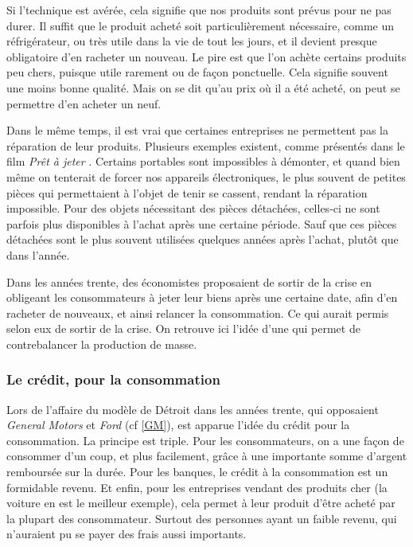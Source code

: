 Si l'\op technique est avérée, cela signifie que nos produits sont prévus pour ne pas durer. Il suffit que le produit acheté soit particulièrement nécessaire, comme un réfrigérateur, ou très utile dans la vie de tout les jours, et il devient presque obligatoire d'en racheter un nouveau. Le pire est que l'on achète certains produits peu chers, puisque utile rarement ou de façon ponctuelle. Cela signifie souvent une moins bonne qualité. Mais on se dit qu'au prix où il a été acheté, on peut se permettre d'en acheter un neuf.

Dans le même temps, il est vrai que certaines entreprises ne permettent pas la réparation de leur produits. Plusieurs exemples existent, comme présentés dans le film \textit{Prêt à jeter} \cite{PretAjeter}. Certains portables sont impossibles à démonter, et quand bien même on tenterait de forcer nos appareils électroniques, le plus souvent de petites pièces qui permettaient à l'objet de tenir se cassent, rendant la réparation impossible. Pour des objets nécessitant des pièces détachées, celles-ci ne sont parfois plus disponibles à l'achat après une certaine période. Sauf que ces pièces détachées sont le plus souvent utilisées quelques années après l'achat, plutôt que dans l'année.

\bigbreak
Dans les années trente, des économistes proposaient de sortir de la crise en obligeant les consommateurs à jeter leur biens après une certaine date, afin d'en racheter de nouveaux, et ainsi relancer la consommation. Ce qui aurait permis selon eux de sortir de la crise. On retrouve ici l'idée d'une \op qui permet de contrebalancer la production de masse. 


\subsubsection{Le crédit, pour la consommation}
Lors de l'affaire du modèle de Détroit dans les années trente, qui opposaient \textit{General Motors} et \textit{Ford} (cf \ref{GM}), est apparue l'idée du crédit pour la consommation. La principe est triple. Pour les consommateurs, on a une façon de consommer d'un coup, et plus facilement, grâce à une importante somme d'argent remboursée sur la durée. Pour les banques, le crédit à la consommation est un formidable revenu. Et enfin, pour les entreprises vendant des produits cher (la voiture en est le meilleur exemple), cela permet à leur produit d'être acheté par la plupart des consommateur. Surtout des personnes ayant un faible revenu, qui n'auraient pu se payer des frais aussi importants.

